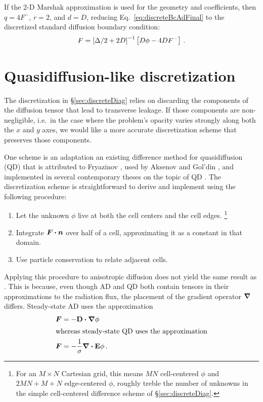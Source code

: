 If the 2-D Marshak approximation is used for the geometry and coefficients, then
$q=4F^-$, $r=2$, and $d=D$, reducing Eq.~\eqref{eq:discreteBcAdFinal} to the
discretized standard diffusion boundary condition:
\begin{equation*}
  F = \left[ \Delta/2 + 2D \right]^{-1} \left[ D\phi - 4DF^-  \right] \,.
\end{equation*}

\section{Quasidiffusion-like discretization}

The discretization in \S\ref{sec:discreteDiag} relies on discarding the
components of the diffusion tensor that lead to transverse leakage. If those
components are non-negligible, i.e.~in the case where the problem's opacity
varies strongly along both the $x$ and $y$ axes, we would like a
more accurate discretization scheme that preserves those components.

One scheme is an adaptation an existing difference method for quasidiffusion
(QD) that is attributed to Fryazinov \cite{Fry1976}, used by Aksenov and Gol'din
\cite{Aks1979}, and implemented in several contemporary theses on the topic of
QD \cite{Val2002,Wie2009}. The discretization scheme is straightforward to
derive and implement using the following procedure:
\begin{enumerate}
  \item Let the unknown $\phi$ live at both the cell centers and the
  cell edges.%
  \footnote{%
  For an $M\times N$ Cartesian grid, this means $MN$
  cell-centered $\phi$ and $2MN + M + N$ edge-centered $\phi$, roughly treble
  the number of unknowns in the simple cell-centered difference scheme of
  \S\ref{sec:discreteDiag}.%
  }
  \item Integrate $\bm{F}\bm{\cdot} \bm{n}$ over half of a cell, approximating
  it as a constant in that domain.
  \item Use particle conservation to relate adjacent cells.
\end{enumerate}

Applying this procedure to anisotropic diffusion does not yield the same result
as \cite{Val2002}. This is because, even though AD and QD both contain tensors
in their approximations to the radiation flux, the placement of the gradient
operator $\bm{\nabla}$ differs. Steady-state AD uses the approximation
\begin{align*}
  \bm{F} &= - \mathbf{D} \bm{\cdot} \bm{\nabla} \phi
  \\ 
  \intertext{whereas steady-state QD uses the approximation}
  \bm{F} &= - \frac{1}{\sigma} \bm{\nabla} \bm{\cdot} \mathbf{E} \phi\,.
\end{align*}

